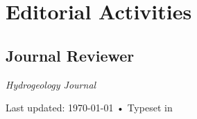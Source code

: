 \documentclass[11pt, letterpaper]{article}
\begin{document}
\section*{Editorial Activities}
\subsection*{Journal Reviewer}\noindent

\textit{Hydrogeology Journal}\\


\vfill{}

\begin{center}
{\scriptsize  Last updated: \today\- •\- Typeset in \href{http://nitens.org/taraborelli/cvtex}{
\XeTeX }}
\end{center}
\end{document}
